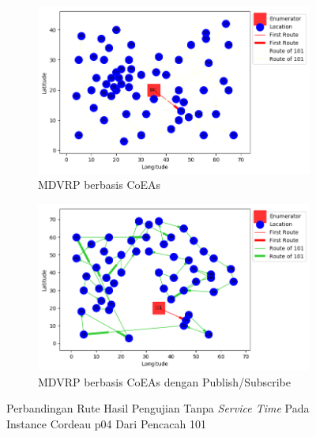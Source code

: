 \begin{figure}[H]
	\centering
	\begin{subfigure}[t]{\textwidth}
		\centering
		\includegraphics[width=\textwidth]{Resources/Images/cordeau_p04/cordeau_p04_notw_101_coes}
		\caption{MDVRP berbasis CoEAs}
		\label{fig:cordeau_p04_notw_101_coes}
	\end{subfigure}
	\begin{subfigure}[t]{\textwidth}
		\centering
		\includegraphics[width=\textwidth]{Resources/Images/cordeau_p04/cordeau_p04_notw_101_pubsub_coes}
		\caption{MDVRP berbasis CoEAs dengan Publish/Subscribe}
		\label{fig:cordeau_p04_notw_101_pubsub_coes}
	\end{subfigure}
	\caption{Perbandingan Rute Hasil Pengujian Tanpa \textit{Service Time} Pada Instance Cordeau p04 Dari Pencacah 101}
	\label{fig:cordeau_p04_notw_101}
\end{figure}


